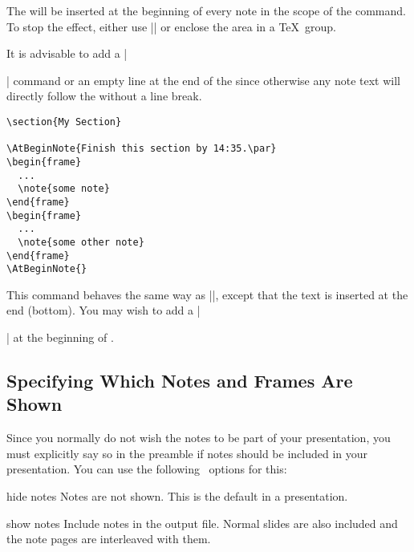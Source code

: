 \begin{command}{\AtBeginNote{}}
  The  will be inserted at the beginning of every note in the scope of the command. To stop the effect, either use |\AtBeginNote{}| or enclose the area in a \TeX\ group.

  It is advisable to add a |\par| command or an empty line at the end of the  since otherwise any note text will directly follow the  without a line break.

  \example
\begin{verbatim}
\section{My Section}

\AtBeginNote{Finish this section by 14:35.\par}
\begin{frame}
  ...
  \note{some note}
\end{frame}
\begin{frame}
  ...
  \note{some other note}
\end{frame}
\AtBeginNote{}
\end{verbatim}
\end{command}

\begin{command}{\AtEndNote{}}
  This command behaves the same way as |\AtBeginNote|, except that the text is inserted at the end (bottom). You may wish to add a |\par| at the beginning of .
\end{command}


\subsection{Specifying Which Notes and Frames Are Shown}

Since you normally do not wish the notes to be part of your presentation, you must explicitly say so in the preamble if notes should be included in your presentation. You can use the following \beamer\ options for this:

\begin{beameroption}{hide notes}{}
  Notes are not shown. This is the default in a presentation.
\end{beameroption}

\begin{beameroption}{show notes}{}
  Include notes in the output file. Normal slides are also included and the note pages are interleaved with them.
\end{beameroption}


